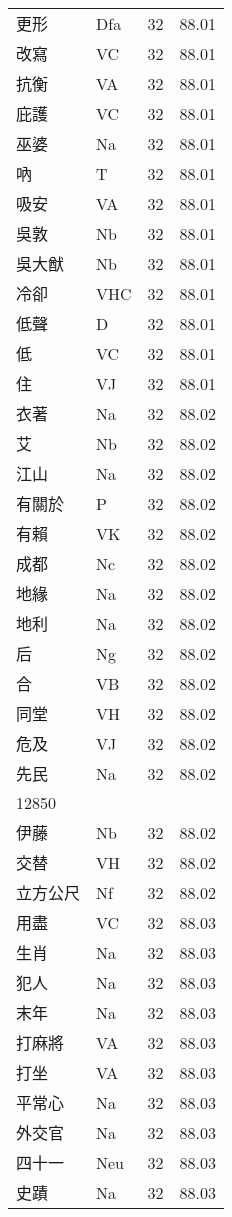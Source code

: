 \documentclass[twocolumn]{book}
\begin{document}
\begin{supertabular}{llrr}
更形 & Dfa & 32 &  88.01\\
改寫 & VC & 32 &  88.01\\
抗衡 & VA & 32 &  88.01\\
庇護 & VC & 32 &  88.01\\
巫婆 & Na & 32 &  88.01\\
吶 & T & 32 &  88.01\\
吸安 & VA & 32 &  88.01\\
吳敦 & Nb & 32 &  88.01\\
吳大猷 & Nb & 32 &  88.01\\
冷卻 & VHC & 32 &  88.01\\
低聲 & D & 32 &  88.01\\
低 & VC & 32 &  88.01\\
住 & VJ & 32 &  88.01\\
衣著 & Na & 32 &  88.02\\
艾 & Nb & 32 &  88.02\\
江山 & Na & 32 &  88.02\\
有關於 & P & 32 &  88.02\\
有賴 & VK & 32 &  88.02\\
成都 & Nc & 32 &  88.02\\
地緣 & Na & 32 &  88.02\\
地利 & Na & 32 &  88.02\\
后 & Ng & 32 &  88.02\\
合 & VB & 32 &  88.02\\
同堂 & VH & 32 &  88.02\\
危及 & VJ & 32 &  88.02\\
先民 & Na & 32 &  88.02\\
12850\\
伊藤 & Nb & 32 &  88.02\\
交替 & VH & 32 &  88.02\\
立方公尺 & Nf & 32 &  88.02\\
用盡 & VC & 32 &  88.03\\
生肖 & Na & 32 &  88.03\\
犯人 & Na & 32 &  88.03\\
末年 & Na & 32 &  88.03\\
打麻將 & VA & 32 &  88.03\\
打坐 & VA & 32 &  88.03\\
平常心 & Na & 32 &  88.03\\
外交官 & Na & 32 &  88.03\\
四十一 & Neu & 32 &  88.03\\
史蹟 & Na & 32 &  88.03\\

\end{supertabular}
\end{document}

